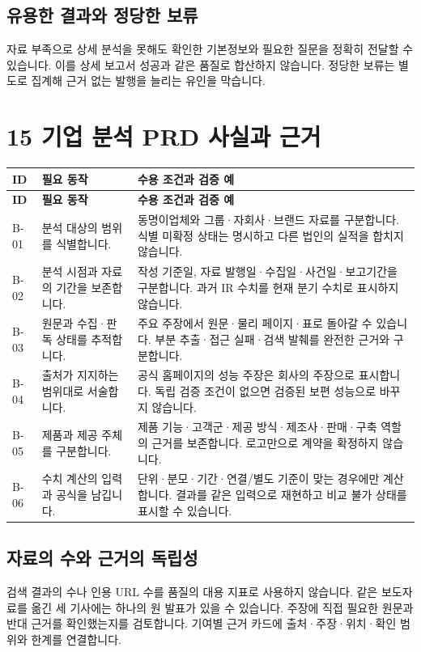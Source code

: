 \documentclass[a4paper,10pt]{article}
\newcommand{\Hline}{\noalign{\hrule height 1.5pt}}
\begin{document}
\endgroup
\subsection*{유용한 결과와 정당한 보류}
자료 부족으로 상세 분석을 못해도 확인한 기본정보와 필요한 질문을 정확히 전달할 수 있습니다. 이를 상세 보고서 성공과 같은 품질로 합산하지 않습니다. 정당한 보류는 별도로 집계해 근거 없는 발행을 늘리는 유인을 막습니다.


\clearpage
\section*{15 기업 분석 PRD 사실과 근거}
{\fontsize{9.5}{14.06}\selectfont
\begin{longtable}{!{\vrule width 1.5pt}L{18.94mm}|L{55.23mm}|L{83.63mm}!{\vrule width 1.5pt}}
\Hline{} \textbf{ID} & \textbf{필요 동작} & \textbf{수용 조건과 검증 예}\\\hline\endfirsthead
\Hline{} \textbf{ID} & \textbf{필요 동작} & \textbf{수용 조건과 검증 예}\\\hline\endhead
\hline\endfoot\Hline\endlastfoot
B-01 & 분석 대상의 범위를 식별합니다. & 동명이업체와 그룹·자회사·브랜드 자료를 구분합니다. 식별 미확정 상태는 명시하고 다른 법인의 실적을 합치지 않습니다.\\\hline
B-02 & 분석 시점과 자료의 기간을 보존합니다. & 작성 기준일, 자료 발행일·수집일·사건일·보고기간을 구분합니다. 과거 IR 수치를 현재 분기 수치로 표시하지 않습니다.\\\hline
B-03 & 원문과 수집·판독 상태를 추적합니다. & 주요 주장에서 원문·물리 페이지·표로 돌아갈 수 있습니다. 부분 추출·접근 실패·검색 발췌를 완전한 근거와 구분합니다.\\\hline
B-04 & 출처가 지지하는 범위대로 서술합니다. & 공식 홈페이지의 성능 주장은 회사의 주장으로 표시합니다. 독립 검증 조건이 없으면 검증된 보편 성능으로 바꾸지 않습니다.\\\hline
B-05 & 제품과 제공 주체를 구분합니다. & 제품 기능·고객군·제공 방식·제조사·판매·구축 역할의 근거를 보존합니다. 로고만으로 계약을 확정하지 않습니다.\\\hline
B-06 & 수치 계산의 입력과 공식을 남깁니다. & 단위·분모·기간·연결/별도 기준이 맞는 경우에만 계산합니다. 결과를 같은 입력으로 재현하고 비교 불가 상태를 표시할 수 있습니다.\\\hline
\end{longtable}}
\subsection*{자료의 수와 근거의 독립성}
검색 결과의 수나 인용 URL 수를 품질의 대용 지표로 사용하지 않습니다. 같은 보도자료를 옮긴 세 기사에는 하나의 원 발표가 있을 수 있습니다. 주장에 직접 필요한 원문과 반대 근거를 확인했는지를 검토합니다. 기여별 근거 카드에 출처·주장·위치·확인 범위와 한계를 연결합니다.
\end{document}
